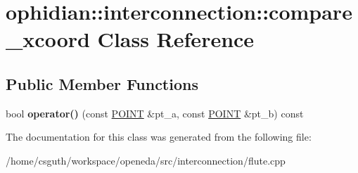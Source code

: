 \hypertarget{classophidian_1_1interconnection_1_1compare__xcoord}{\section{ophidian\-:\-:interconnection\-:\-:compare\-\_\-xcoord Class Reference}
\label{classophidian_1_1interconnection_1_1compare__xcoord}
}
\subsection*{Public Member Functions}
\begin{DoxyCompactItemize}
\item 
\hypertarget{classophidian_1_1interconnection_1_1compare__xcoord_a4295d7e828549b5a74a62dd57f654820}{bool {\bfseries operator()} (const \hyperlink{structophidian_1_1interconnection_1_1point}{P\-O\-I\-N\-T} \&pt\-\_\-a, const \hyperlink{structophidian_1_1interconnection_1_1point}{P\-O\-I\-N\-T} \&pt\-\_\-b) const }\label{classophidian_1_1interconnection_1_1compare__xcoord_a4295d7e828549b5a74a62dd57f654820}

\end{DoxyCompactItemize}


The documentation for this class was generated from the following file\-:\begin{DoxyCompactItemize}
\item 
/home/csguth/workspace/openeda/src/interconnection/flute.\-cpp\end{DoxyCompactItemize}
